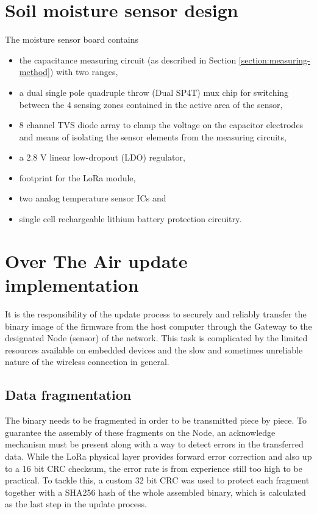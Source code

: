 \section{Soil moisture sensor design}
The moisture sensor board contains 
\begin{itemize}
    \item the capacitance measuring circuit (as described in Section \ref{section:measuring-method}) with two ranges,
    \item a dual single pole quadruple throw (Dual SP4T) mux chip for switching between the 4 sensing zones contained in the active area of the sensor,
    \item 8 channel TVS diode array to clamp the voltage on the capacitor electrodes and means of isolating the sensor elements from the measuring circuits,
    \item a 2.8 V linear low-dropout (LDO) regulator,
    \item footprint for the LoRa module,
    \item two analog temperature sensor ICs and
    \item single cell rechargeable lithium battery protection circuitry.
\end{itemize}


\section{Over The Air update implementation}
It is the responsibility of the update process to securely and reliably transfer the binary image of the firmware from the host computer through the Gateway to the designated Node (sensor) of the network. This task is complicated by the limited resources available on embedded devices and the slow and sometimes unreliable nature of the wireless connection in general.

\subsection{Data fragmentation}
The binary needs to be fragmented in order to be transmitted piece by piece. To guarantee the assembly of these fragments on the Node, an acknowledge mechanism must be present along with a way to detect errors in the transferred data. While the LoRa physical layer provides forward error correction and also up to a 16 bit CRC checksum, the error rate is from experience still too high to be practical. To tackle this, a custom 32 bit CRC was used to protect each fragment together with a SHA256 hash of the whole assembled binary, which is calculated as the last step in the update process.

